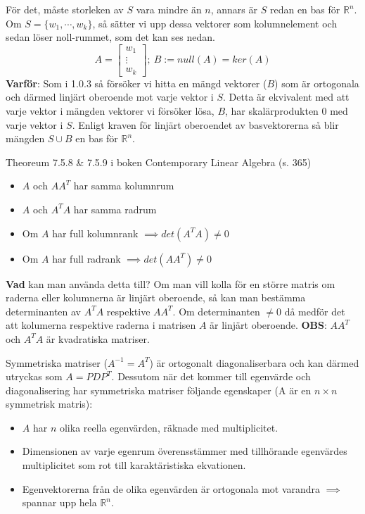 \documentclass{report}
\begin{document}
{
För det, måste storleken av $ S $ vara mindre än $ n $, annars är $ S $ redan en bas för $ \mathbb{R}^n $. Om $ S = \{ w_1, \cdots, w_k\} $, så sätter vi upp dessa vektorer som kolumnelement och sedan löser noll-rummet, som det kan ses nedan.
\[
A =
\begin{bmatrix}
	w_1 \\
	\vdots \\
	w_k
\end{bmatrix}; \: B := null(A) = ker(A)
\]
\textbf{Varför}: Som i 1.0.3 så försöker vi hitta en mängd vektorer ($ B $) som är ortogonala och därmed linjärt oberoende mot varje vektor i $ S $. Detta är ekvivalent med att varje vektor i mängden vektorer vi försöker lösa, $ B $, har skalärprodukten 0 med varje vektor i $ S $. Enligt kraven för linjärt oberoendet av basvektorerna så blir mängden $ S \cup B $ en bas för $ \mathbb{R}^n $.  
}

\pagebreak

{
Theoreum 7.5.8 \& 7.5.9 i boken Contemporary Linear Algebra (s. 365)
\begin{itemize}
	\item $A$ och $A A^T$ har samma kolumnrum
	\item $A$ och $A^T A$ har samma radrum
	\item Om $A$ har full kolumnrank $ \implies det(A^T A) \ne 0 $
	\item Om $A$ har full radrank $ \implies det(A A^T) \ne 0 $
\end{itemize}
\textbf{Vad} kan man använda detta till? Om man vill kolla för en större matris om raderna eller kolumnerna är linjärt oberoende, så kan man bestämma determinanten av $A^T A$ respektive $A A^T$. Om determinanten $ \ne 0$ då medför det att kolumerna respektive raderna i matrisen $A$ är linjärt oberoende. \textbf{OBS}: $A A^T$ och $A^T A$ är kvadratiska matriser.  
}

{
Symmetriska matriser ($ A^{-1} = A^T $) är ortogonalt diagonaliserbara och kan därmed utryckas som $ A = P D P^T $. Dessutom när det kommer till egenvärde och diagonalisering har symmetriska matriser följande egenskaper (A är en $n \times n$ symmetrisk matris):
\begin{itemize}
	\item $ A $ har $ n $ olika reella egenvärden, räknade med multiplicitet.
	\item Dimensionen av varje egenrum överensstämmer med tillhörande egenvärdes multiplicitet som rot till karaktäristiska ekvationen.
	\item Egenvektorerna från de olika egenvärden är ortogonala mot varandra $ \implies $ spannar upp hela $ \mathbb{R}^n $.
\end{itemize}
}
\end{document}
